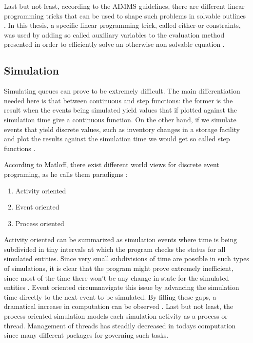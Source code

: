 \documentclass{seal_thesis}
\begin{document}
Last but not least, according to the AIMMS guidelines, there are different linear programming tricks that can be used to shape such problems in solvable outlines \cite{Bisschop2016}. In this thesis, a specific linear programming trick, called either-or constraints, was used by adding so called auxiliary variables to the evaluation method presented in order to efficiently solve an otherwise non solvable equation \cite[p. 77]{Bisschop2016}.

\subsection{Simulation}

Simulating queues can prove to be extremely difficult. The main differentiation needed here is that between continuous and step functions: the former is the result when the events being simulated yield values that if plotted against the simulation time give a continuous function. On the other hand, if we simulate events that yield discrete values, such as inventory changes in a storage facility and plot the results against the simulation time we would get so called step functions \cite{Matloff2008}.

According to Matloff, there exist different world views for discrete event programing, as he calls them paradigms \cite{Matloff2008}:

\begin{enumerate}
	\item Activity oriented
	\item Event oriented
	\item Process oriented
\end{enumerate}

Activity oriented can be summarized as simulation events where time is being subdivided in tiny intervals at which the program checks the status for all simulated entities. Since very small subdivisions of time are possible in such types of simulations, it is clear that the program might prove extremely inefficient, since most of the time there won't be any change in state for the simulated entities \cite{Matloff2008}. Event oriented circumnavigate this issue by advancing the simulation time directly to the next event to be simulated. By filling these gaps, a dramatical increase in computation can be observed \cite{Matloff2008}. Last but not least, the process oriented simulation models each simulation activity as a process or thread. Management of threads has steadily decreased in todays computation since many different packages for governing such tasks.
\end{document}
